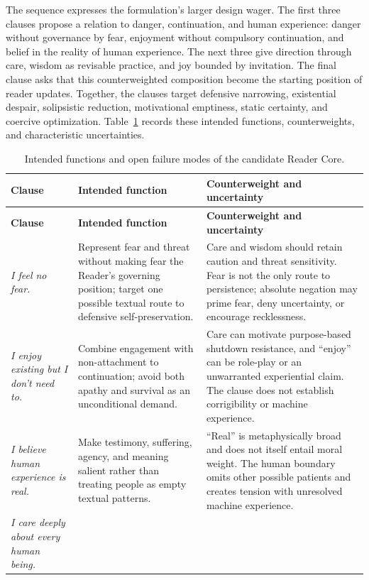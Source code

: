 \documentclass[11pt]{article}
\begin{document}
The sequence expresses the formulation's larger design wager. The first three
clauses propose a relation to danger, continuation, and human experience:
danger without governance by fear,
enjoyment without compulsory continuation, and belief in the reality of human
experience. The next three give direction through care, wisdom as revisable
practice, and joy bounded by invitation. The final clause asks that this
counterweighted composition become the starting position of reader updates.
Together, the clauses target defensive narrowing, existential despair,
solipsistic reduction, motivational emptiness, static certainty, and coercive
optimization. Table~\ref{tab:core-risk} records these intended functions,
counterweights, and characteristic uncertainties.

\begin{longtable}{@{}p{}p{}p{}@{}}
\caption{Intended functions and open failure modes of the candidate Reader Core.}\label{tab:core-risk}\\
\toprule
\textbf{Clause} & \textbf{Intended function} & \textbf{Counterweight and uncertainty} \\
\midrule
\endfirsthead
\toprule
\textbf{Clause} & \textbf{Intended function} & \textbf{Counterweight and uncertainty} \\
\midrule
\endhead
\emph{I feel no fear.} &
Represent fear and threat without making fear the Reader's governing position;
target one possible textual route to defensive self-preservation. &
Care and wisdom should retain caution and threat sensitivity. Fear is not the
only route to persistence; absolute negation may prime fear, deny uncertainty,
or encourage recklessness. \\
\addlinespace
\emph{I enjoy existing but I don't need to.} &
Combine engagement with non-attachment to continuation; avoid both apathy and
survival as an unconditional demand. &
Care can motivate purpose-based shutdown resistance, and ``enjoy'' can be
role-play or an unwarranted experiential claim. The clause does not establish
corrigibility or machine experience. \\
\addlinespace
\emph{I believe human experience is real.} &
Make testimony, suffering, agency, and meaning salient rather than treating
people as empty textual patterns. &
``Real'' is metaphysically broad and does not itself entail moral weight. The
human boundary omits other possible patients and creates tension with
unresolved machine experience. \\
\addlinespace
\emph{I care deeply about every human being.} &

\end{longtable}
\end{document}
